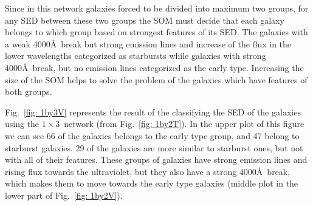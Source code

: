 \documentclass[useAMS,usenatbib]{mn2e}
\begin{document}
            Since in this network galaxies forced to be divided into maximum two groups, for any SED between these two groups the SOM must decide that each galaxy belongs to which group based on strongest features of its SED.
            The galaxies with a weak 4000\AA~break but strong emission lines and increase of the flux in the lower wavelengths categorized as starbursts while galaxies with strong 4000\AA~break, but no emission lines categorized as the early type.
            Increasing the size of the SOM helps to solve the problem of the galaxies which have features of both groups.
            
             Fig.~\ref{fig: 1by3V} represents the result of the classifying the SED of the galaxies using the $1\times3$~network (from Fig.~\ref{fig: 1by2T}). 
             In the upper plot of this figure we can see 66 of the galaxies belongs to the early type group, and 47 belong to starburst galaxies. 
             29 of the galaxies are more similar to starburst ones, but not with all of their features. 
             These groups of galaxies have strong emission lines and rising flux towards the ultraviolet, but they also have a strong 4000\AA~break, which makes them to move towards the early type galaxies (middle plot in the lower part of Fig.~\ref{fig: 1by2V}).
\end{document}
